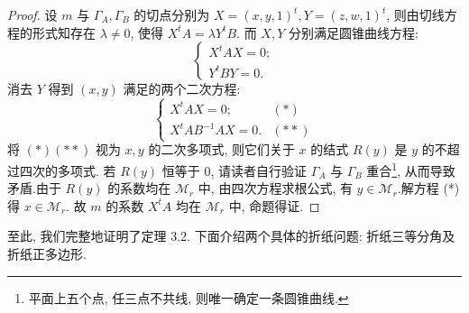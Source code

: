 \begin{proof}
    设 $m$ 与 $\Gamma_A,\Gamma_B$ 的切点分别为 $X=(x,y,1)^t,Y=(z,w,1)^t$, 
    则由切线方程的形式知存在 $\lambda\neq 0$, 使得 $X^tA=\lambda Y^tB$.
    而 $X,Y$ 分别满足圆锥曲线方程: 
    $$
    \begin{cases}
        X^tAX=0;\\
        Y^tBY=0.
    \end{cases}
    $$
    消去 $Y$ 得到 $(x,y)$ 满足的两个二次方程:
    $$
    \begin{cases}
        X^tAX=0;\qquad &(*)\\
        X^tAB^{-1}AX=0. &(**)
    \end{cases}
    $$
    将 $(*)(**)$ 视为 $x,y$ 的二次多项式, 则它们关于 $x$ 的结式 $R(y)$ 是 $y$ 的不超过四次的多项式.
    若 $R(y)$ 恒等于 $0$, 请读者自行验证 $\Gamma_A$ 与 $\Gamma_B$ 重合\footnote{平面上五个点, 任三点不共线, 则唯一确定一条圆锥曲线.}, 
    从而导致矛盾.由于 $R(y)$ 的系数均在 $\mathcal{M}_r$ 中, 
    由四次方程求根公式, 有 $y\in\mathcal{M}_r$.解方程 (*) 得 $x\in\mathcal{M}_r$.
    故 $m$ 的系数 $X^tA$ 均在 $\mathcal{M}_r$ 中, 命题得证.
\end{proof}

至此, 我们完整地证明了定理 3.2. 下面介绍两个具体的折纸问题: 折纸三等分角及折纸正多边形.
